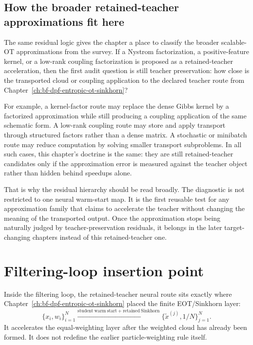 \subsection{How the broader retained-teacher approximations fit here}
\label{sec:bf-learned-ot-broader-retained}

The same residual logic gives the chapter a place to classify the broader
scalable-OT approximations from the survey.  If a Nystrom factorization, a
positive-feature kernel, or a low-rank coupling factorization is proposed as a
retained-teacher acceleration, then the first audit question is still teacher
preservation: how close is the transported cloud or coupling application to the
declared teacher route from Chapter~\ref{ch:bf-dpf-entropic-ot-sinkhorn}?

For example, a kernel-factor route may replace the dense Gibbs kernel by a
factorized approximation while still producing a coupling application of the same
schematic form.  A low-rank coupling route may store and apply transport through
structured factors rather than a dense matrix.  A stochastic or minibatch route
may reduce computation by solving smaller transport subproblems.  In all such
cases, this chapter's doctrine is the same: they are still retained-teacher
candidates only if the approximation error is measured against the teacher object
rather than hidden behind speedups alone.

That is why the residual hierarchy should be read broadly.  The diagnostic is not
restricted to one neural warm-start map.  It is the first reusable test for any
approximation family that claims to accelerate the teacher without changing the
meaning of the transported output.  Once the approximation stops being naturally
judged by teacher-preservation residuals, it belongs in the later target-changing
chapters instead of this retained-teacher one.

\section{Filtering-loop insertion point}
\label{sec:bf-learned-ot-loop}

Inside the filtering loop, the retained-teacher neural route sits exactly where
Chapter~\ref{ch:bf-dpf-entropic-ot-sinkhorn} placed the finite EOT/Sinkhorn
layer:
\begin{equation}
\label{eq:bf-learned-ot-loop}
  \{x_i,w_i\}_{i=1}^N
  \xrightarrow{\mathrm{student\ warm\ start + retained\ Sinkhorn}}
  \{\tilde x^{(j)},1/N\}_{j=1}^N.
\end{equation}
It accelerates the equal-weighting layer after the weighted cloud has already
been formed.  It does not redefine the earlier particle-weighting rule itself.

